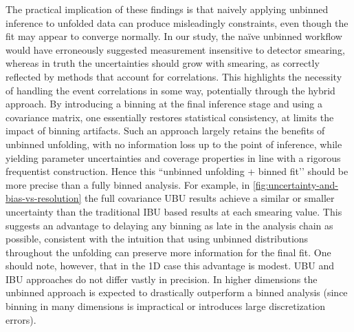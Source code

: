         The practical implication of these findings is that naively applying unbinned inference to unfolded data can produce misleadingly constraints, even though the fit may appear to converge normally.
        In our study, the na\"ive unbinned workflow would have erroneously suggested measurement insensitive to detector smearing, whereas in truth the uncertainties should grow with smearing, as correctly reflected by methods that account for correlations.
        This highlights the necessity of handling the event correlations in some way, potentially through the hybrid approach.
        By introducing a binning at the final inference stage and using a covariance matrix, one essentially restores statistical consistency, at limits the impact of binning artifacts.
        Such an approach largely retains the benefits of unbinned unfolding, with no information loss up to the point of inference, while yielding parameter uncertainties and coverage properties in line with a rigorous frequentist construction.
        Hence this “unbinned unfolding + binned fit’’ should be more precise than a fully binned analysis.
        For example, in \cref{fig:uncertainty-and-bias-vs-resolution} the full covariance UBU results achieve a similar or smaller uncertainty than the traditional IBU based results at each smearing value.
        This suggests an advantage to delaying any binning as late in the analysis chain as possible, consistent with the intuition that using unbinned distributions throughout the unfolding can preserve more information for the final fit.
        One should note, however, that in the 1D case this advantage is modest.
        UBU and IBU approaches do not differ vastly in precision.
        In higher dimensions the unbinned approach is expected to drastically outperform a binned analysis (since binning in many dimensions is impractical or introduces large discretization errors).
    
